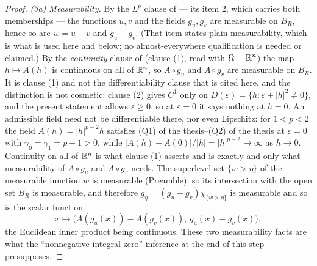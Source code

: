 \begin{proof}
\emph{(3a) Measurability.}  By the $L^p$ clause of  --- its
item 2, which carries both memberships --- the functions $u,v$ and the fields
$g_u,g_v$ are measurable on $B_R$, hence so are $w=u-v$ and $g_u-g_v$.  (That
item states plain measurability, which is what is used here and below; no
almost-everywhere qualification is needed or claimed.)
By the \emph{continuity} clause of 
(clause (1), read with $\Omega=\mathbb{R}^n$) the map $h\mapsto A(h)$ is continuous on
all of $\mathbb{R}^n$, so $A\circ g_u$ and $A\circ g_v$ are measurable on $B_R$.  It is
clause (1) and not the differentiability clause that is cited here, and the
distinction is not cosmetic: clause (2) gives $C^1$ only on
$D(\varepsilon)=\{h:\varepsilon+|h|^2\ne0\}$, and the present statement allows
$\varepsilon\ge0$, so at $\varepsilon=0$ it says nothing at $h=0$.  An
admissible field need not be differentiable there, nor even Lipschitz: for
$1<p<2$ the field $A(h)=|h|^{p-2}h$ satisfies (Q1) of the thesis--(Q2) of the thesis at
$\varepsilon=0$ with $\gamma_0=\gamma_1=p-1>0$, while
$|A(h)-A(0)|/|h|=|h|^{p-2}\to\infty$ as $h\to0$.  Continuity on all of $\mathbb{R}^n$
is what clause (1) asserts and is exactly and only what measurability of
$A\circ g_u$ and $A\circ g_v$ needs.  The
superlevel set $\{w>\eta\}$ of the measurable function $w$ is measurable
(Preamble), so its intersection with the open set $B_R$ is measurable, and
therefore $g_\eta=(g_u-g_v)\chi_{\{w>\eta\}}$ is measurable and so is the
scalar function
\[
x\longmapsto\bigl(A(g_u(x))-A(g_v(x)),\,g_u(x)-g_v(x)\bigr),
\]
the Euclidean inner product being continuous.  These two measurability facts are
what the ``nonnegative integral zero'' inference at the end of this step
presupposes.


\end{proof}
